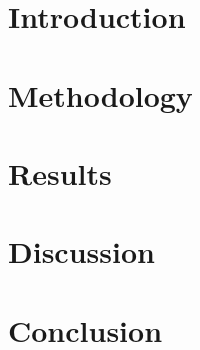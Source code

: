 \documentclass[HARVARD,LATO2COL]{WileyNJDv5}
\begin{document}
\title{}

\author[1]{}
\author[2]{}

\authormark{}
\titlemark{}

\address[1]{\orgdiv{}, \orgname{}, \orgaddress{\state{}, \country{}}}

\corres{\email{}}

\abstract[]{}

\keywords{}

\maketitle

\section{Introduction}

\section{Methodology}

\section{Results}

\section{Discussion}

\section{Conclusion}



\end{document}
